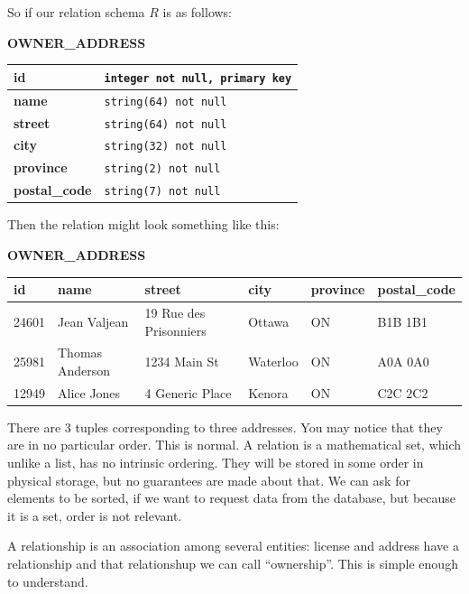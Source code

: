 So if our relation schema $R$ is as follows:
\begin{center}
		\textbf{OWNER\_ADDRESS}\\
	\begin{tabular}{|l|l|}\hline
		\textbf{id} & \texttt{integer not null,  primary key}\\ \hline
		\textbf{name} & \texttt{string(64) not null}\\ \hline
		\textbf{street} & \texttt{string(64) not null}\\ \hline
		\textbf{city} & \texttt{string(32) not null}\\ \hline
		\textbf{province} & \texttt{string(2) not null}\\ \hline
		\textbf{postal\_code} & \texttt{string(7) not null}\\ \hline

	\end{tabular}
\end{center}

Then the relation might look something like this:
\begin{center}
		\textbf{OWNER\_ADDRESS}\\
	\begin{tabular}{|l|l|l|l|l|l|}\hline
		\textbf{id} & \textbf{name} &\textbf{street} & \textbf{city} & \textbf{province} & \textbf{postal\_code} \\ \hline
		24601 & Jean Valjean & 19 Rue des Prisonniers & Ottawa & ON & B1B 1B1\\ \hline
		25981 & Thomas Anderson & 1234 Main St & Waterloo & ON & A0A 0A0\\ \hline
		12949 & Alice Jones & 4 Generic Place & Kenora & ON & C2C 2C2\\ \hline
	\end{tabular}
\end{center}

There are 3 tuples corresponding to three addresses. You may notice that they are in no particular order. This is normal. A relation is a mathematical set, which unlike a list, has no intrinsic ordering. They will be stored in some order in physical storage, but no guarantees are made about that. We can ask for elements to be sorted, if we want to request data from the database, but because it is a set, order is not relevant.

A relationship is an association among several entities: license and address have a relationship and that relationshup we can call ``ownership''. This is simple enough to understand.

